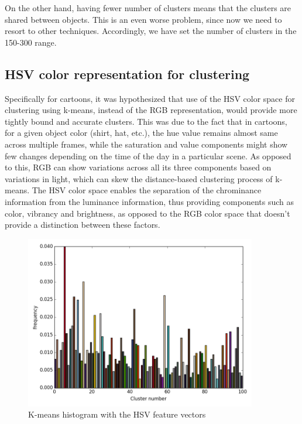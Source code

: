 \documentclass[10pt,twocolumn,letterpaper]{article}
\begin{document}
On the other hand, having fewer number of clusters means that the
clusters are shared between objects. This is an even worse problem,
since now we need to resort to other techniques. Accordingly, we have
set the number of clusters in the 150-300 range.


\subsection{HSV color representation for clustering}



Specifically for cartoons, it was hypothesized that use of the HSV
color space for clustering using k-means, instead of the RGB
representation, would provide more tightly bound and accurate
clusters.  This was due to the fact that in cartoons, for a given
object color (shirt, hat, etc.), the hue value remains almost same
across multiple frames, while the saturation and value components
might show few changes depending on the time of the day in a
particular scene. As opposed to this, RGB can show variations across
all its three components based on variations in light, which can skew
the distance-based clustering process of k-means. The HSV color space
enables the separation of the chrominance information from the
luminance information, thus providing components such as color,
vibrancy and brightness, as opposed to the RGB color space that
doesn’t provide a distinction between these factors.

\begin{figure}[h]
  \centering
  \includegraphics[width=0.9\textwidth]{hsv.png}
  \caption{K-means histogram with the HSV feature vectors}
  \label{hsv}
\end{figure}
\end{document}
